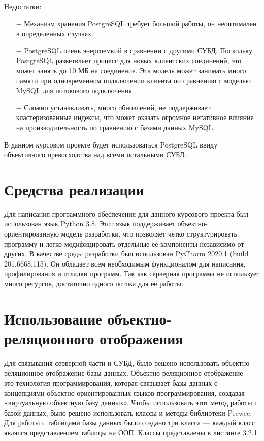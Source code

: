 \documentclass[12pt,a4paper,oneside]{report}
\begin{document}
Недостатки:
\begin{itemize}
	\item[$-$] Механизм хранения PostgreSQL требует большой работы, он неоптимален в определенных случаях.
	\item[$-$] PostgreSQL очень энергоемкий в сравнении с другими СУБД. Поскольку PostgreSQL разветвляет процесс для новых клиентских соединений, это может занять до 10 МБ на соединение. Эта модель может занимать много памяти при одновременном подключении клиента по сравнению с моделью MySQL для потокового подключения.
	\item[$-$] Сложно устанавливать, много обновлений, не поддерживает кластеризованные индексы, что может оказать огромное негативное влияние на производительность по сравнению с базами данных MySQL.

\end{itemize}

В данном курсовом проекте будет использоваться PostgreSQL ввиду объективного превосходства над всеми остальными СУБД.


\section{Средства реализации}
\quad Для написания программного обеспечения для данного курсового проекта был использован язык Python 3.8. Этот язык поддерживает объектно-ориентированную модель разработки, что позволяет четко структурировать программу и легко модифицировать отдельные ее компоненты независимо от других. 
В качестве среды разработки был использован PyCharm 2020.1 (build 201.6668.115). Он обладает всем необходимым функционалом для написания, профилирования и отладки программ.
Так как серверная программа не использует много ресурсов, достаточно одного потока для её работы. 

\section{Использование объектно-реляционного отображения}
Для связывания серверной части и СУБД, было решено использовать объектно-реляционное отображение базы данных.
Объектно-реляционное отображение — это технология программирования, которая связывает базы данных с концепциями объектно-ориентированных языков программирования, создавая «виртуальную объектную базу данных». 
Чтобы использовать этот метод работы с базой данных, было решено использовать классы и методы библиотеки Peewee.
Для работы с таблицами базы данных было создано три класса — каждый класс являлся представлением таблицы на ООП. Классы представлены в листинге 3.2.1
\end{document}
